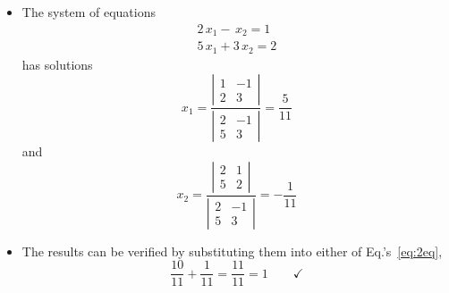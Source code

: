 \documentclass[12pt]{article}
\begin{document}
\begin{itemize}
\item The system of equations
\begin{equation}
\begin{array}{c}
2 \, x_1 - \, x_2 = 1 \\
5 \, x_1 + 3 \, x_2 = 2
\end{array}
\label{eq:2eq}
\end{equation}
has solutions
\begin{equation}
x_1 = 
\frac{
\left|
\begin{array}{cc}
1 & -1 \\
2 & 3 
\end{array}
\right|
}{
\left|
\begin{array}{cc}
2 & -1 \\
5 & 3 
\end{array}
\right|
}
= \frac{5}{11}
\end{equation}
and
\begin{equation}
x_2 = 
\frac{
\left|
\begin{array}{cc}
2 & 1 \\
5 & 2 
\end{array}
\right|
}{
\left|
\begin{array}{cc}
2 & -1 \\
5 & 3 
\end{array}
\right|
}
= -\frac{1}{11}
\end{equation}

\item The results can be verified by substituting them into either of
Eq.'s~\ref{eq:2eq},
\begin{equation}
\frac{10}{11} + \frac{1}{11}  = \frac{11}{11} = 1
\hspace{24pt}\checkmark
\end{equation}

\end{itemize}
\end{document}
